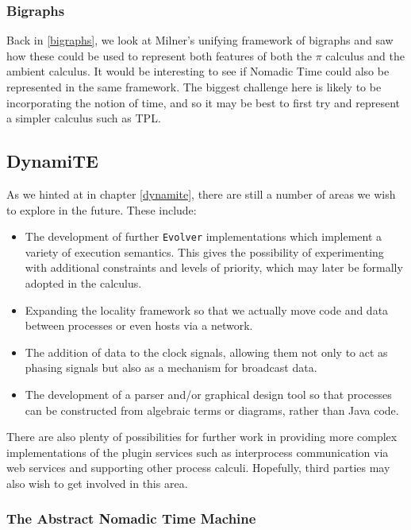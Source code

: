 \subsubsection{Bigraphs}

Back in \ref{bigraphs}, we look at Milner's unifying framework of
bigraphs \cite{bigraph1} and saw how these could be used to represent
both features of both the $\pi$ calculus and the ambient calculus.  It
would be interesting to see if Nomadic Time could also be represented
in the same framework.  The biggest challenge here is likely to be
incorporating the notion of time, and so it may be best to first try
and represent a simpler calculus such as TPL.

\subsection{DynamiTE}
\label{future:dynamite}

As we hinted at in chapter \ref{dynamite}, there are still a number of
areas we wish to explore in the future.  These include:

\begin{itemize}
\item The development of further \texttt{Evolver} implementations
  which implement a variety of execution semantics.  This gives the
  possibility of experimenting with additional constraints and levels
  of priority, which may later be formally adopted in the calculus.
\item Expanding the locality framework so that we actually move code
  and data between processes or even hosts via a network.
\item The addition of data to the clock signals, allowing them not
  only to act as phasing signals but also as a mechanism for broadcast
  data.
\item The development of a parser and/or graphical design tool so that
  processes can be constructed from algebraic terms or diagrams,
  rather than Java code.
\end{itemize}

There are also plenty of possibilities for further work in providing
more complex implementations of the plugin services such as
interprocess communication via web services and supporting other
process calculi.  Hopefully, third parties may also wish to get
involved in this area.

\subsubsection{The Abstract Nomadic Time Machine}

